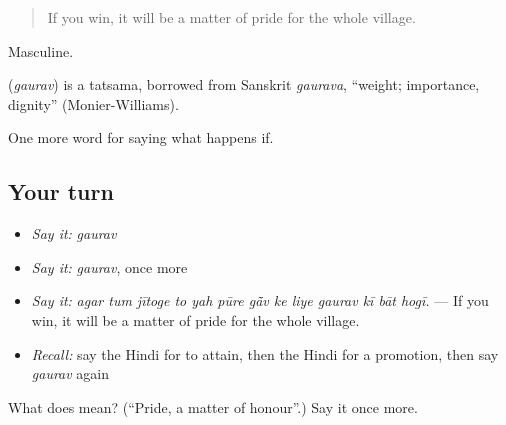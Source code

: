 \begin{quote}
If you win, it will be a matter of pride for the whole village.
\end{quote}

Masculine.

\begin{cousinweb}
\textbf{} (\emph{gaurav}) is a tatsama, borrowed from Sanskrit \emph{gaurava}, \textquotedblleft{}weight; importance, dignity\textquotedblright{} (Monier-Williams).
\end{cousinweb}

\begin{grammarlens}[title={What you've built}]
One more word for saying what happens if.
\end{grammarlens}

\subsection*{Your turn}
\begin{itemize}
\raggedright
  \item \emph{Say it:} \emph{gaurav}
  \item \emph{Say it:} \emph{gaurav}, once more
  \item \emph{Say it:} \emph{agar tum jītoge to yah pūre gā̃v ke liye gaurav kī bāt hogī.} — If you win, it will be a matter of pride for the whole village.
  \item \emph{Recall:} say the Hindi for to attain, then the Hindi for a promotion, then say \emph{gaurav} again
\end{itemize}

\begin{tcolorbox}[breakable,colback=teal!4,colframe=teal!35!black,title={Before you move on}]
What does  mean? (\textquotedblleft{}Pride, a matter of honour\textquotedblright{}.) Say it once more.
\end{tcolorbox}
